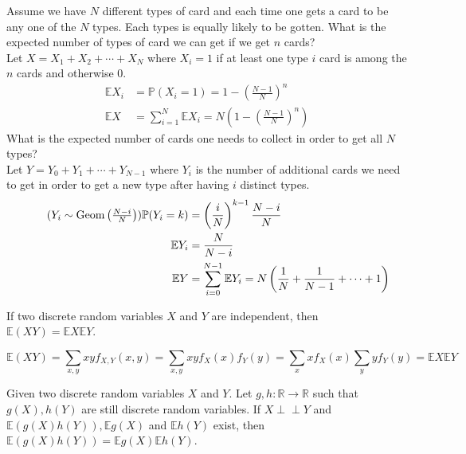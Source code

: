 \documentclass{huhtakm-template-book}
\newcommand{\independent}{\perp\!\!\!\perp}
\newcommand{\prob}{\mathbb{P}}
\newcommand{\expect}{\mathbb{E}}
\DeclareMathOperator{\Geom}{Geom}
\begin{document}
    \begin{eg}
        Assume we have $N$ different types of card and each time one gets a card to be any one of the $N$ types. Each types is equally likely to be gotten. What is the expected number of types of card we can get if we get $n$ cards?\\
        Let $X=X_{1}+X_{2}+\cdots+X_{N}$ where $X_{i}=1$ if at least one type $i$ card is among the $n$ cards and otherwise $0$.
        \begin{align*}
            \expect X_{i}&=\prob(X_{i}=1)=1-\left(\frac{N-1}{N}\right)^{n}\\
            \expect X&=\sum_{i=1}^{N}\expect X_{i}=N\left(1-\left(\frac{N-1}{N}\right)^{n}\right)
        \end{align*}
        What is the expected number of cards one needs to collect in order to get all $N$ types?\\
        Let $Y=Y_{0}+Y_{1}+\cdots+Y_{N-1}$ where $Y_{i}$ is the number of additional cards we need to get in order to get a new type after having $i$ distinct types.
        \begin{align*}
            \tag{$Y_{i}\sim\Geom\left(\frac{N-i}{N}\right)$}
            \prob(Y_{i}=k)&=\left(\frac{i}{N}\right)^{k-1}\frac{N-i}{N}\\
            \expect Y_{i}&=\frac{N}{N-i}\\
            \expect Y&=\sum_{i=0}^{N-1}\expect Y_{i}=N\left(\frac{1}{N}+\frac{1}{N-1}+\cdots+1\right)
        \end{align*}
    \end{eg}
    \begin{lem}
        If two discrete random variables $X$ and $Y$ are independent, then $\expect(XY)=\expect X\expect Y$.
    \end{lem}
    \begin{proofing}
        \begin{equation*}
            \expect(XY)=\sum_{x,y}xyf_{X,Y}(x,y)=\sum_{x,y}xyf_{X}(x)f_{Y}(y)=\sum_{x}xf_{X}(x)\sum_{y}yf_{Y}(y)=\expect X\expect Y
        \end{equation*}
    \end{proofing}
    \begin{lem}
        Given two discrete random variables $X$ and $Y$. Let $g,h:\mathbb{R}\to\mathbb{R}$ such that $g(X),h(Y)$ are still discrete random variables. If $X\independent Y$ and $\expect(g(X)h(Y)),\expect g(X)$ and $\expect h(Y)$ exist, then $\expect(g(X)h(Y))=\expect g(X)\expect h(Y)$.
    \end{lem}
\end{document}

